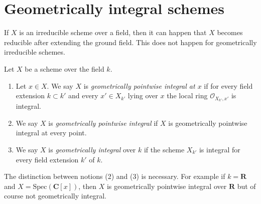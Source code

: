 \section{Geometrically integral schemes}
\label{section-geometrically-integral}

\noindent
If $X$ is an irreducible scheme over a field, then it can happen that $X$
becomes reducible after extending the ground field. This does not happen
for geometrically irreducible schemes.

\begin{definition}
\label{definition-geometrically-integral}
Let $X$ be a scheme over the field $k$.
\begin{enumerate}
\item Let $x \in X$. We say $X$ is
{\it geometrically pointwise integral at $x$} if for every
field extension $k \subset k'$ and every $x' \in X_{k'}$ lying over $x$
the local ring $\mathcal{O}_{X_{k'}, x'}$ is integral.
\item We say $X$ is {\it geometrically pointwise integral} if $X$
is geometrically pointwise integral at every point.
\item We say $X$ is {\it geometrically integral} over $k$ if the scheme
$X_{k'}$ is integral for every field extension $k'$ of $k$.
\end{enumerate}
\end{definition}

\noindent
The distinction between notions (2) and (3) is necessary.
For example if $k = \mathbf{R}$ and $X = \text{Spec}(\mathbf{C}[x])$,
then $X$ is geometrically pointwise integral over $\mathbf{R}$ but
of course not geometrically integral.
























